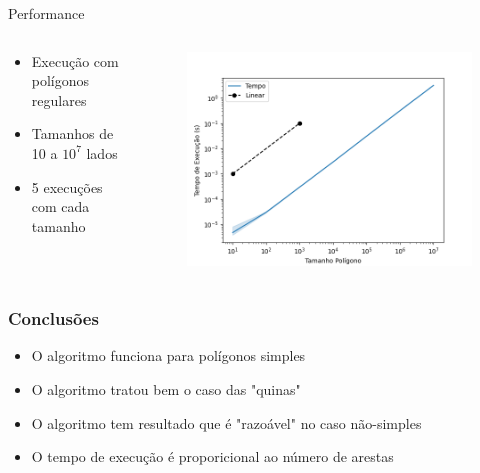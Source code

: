 \documentclass[aspectratio=169]{beamer}
\begin{document}
\begin{frame}{Performance}

  \begin{columns}
    \begin{center}
      \begin{itemize}
        \item Execução com polígonos regulares
        \item Tamanhos de 10 a $10^7$ lados
        \item 5 execuções com cada tamanho
      \end{itemize}
    \end{center}
    \begin{center}   
      \begin{figure}
        \includegraphics[width=1.0\textwidth]{figures/performance.png}
      \end{figure}
    \end{center}
  \end{columns}

\end{frame}

\begin{frame}
\frametitle{Conclusões}

\begin{itemize}
  \item O algoritmo funciona para polígonos simples
  \item O algoritmo tratou bem o caso das "quinas"
  \item O algoritmo tem resultado que é "razoável" no caso não-simples
  \item O tempo de execução é proporicional ao número de arestas
\end{itemize}

\end{frame}
\end{document}
